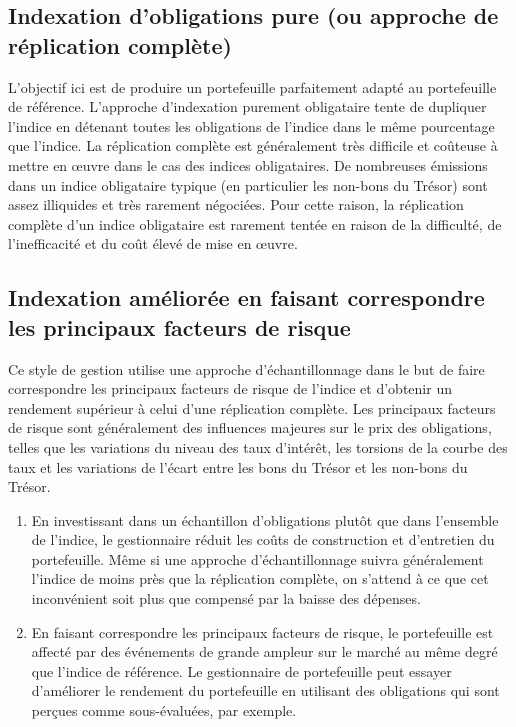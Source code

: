 \documentclass[12pt]{article}
\begin{document}
\subsection{Indexation d'obligations pure (ou approche de réplication complète)}
L'objectif ici est de produire un portefeuille parfaitement adapté au portefeuille de référence. L'approche d'indexation purement obligataire tente de dupliquer l'indice en détenant toutes les obligations de l'indice dans le même pourcentage que l'indice. La réplication complète est généralement très difficile et coûteuse à mettre en œuvre dans le cas des indices obligataires. De nombreuses émissions dans un indice obligataire typique (en particulier les non-bons du Trésor) sont assez illiquides et très rarement négociées. Pour cette raison, la réplication complète d'un indice obligataire est rarement tentée en raison de la difficulté, de l'inefficacité et du coût élevé de mise en œuvre.
\subsection{Indexation améliorée en faisant correspondre les principaux facteurs de risque}
Ce style de gestion utilise une approche d'échantillonnage dans le but de faire correspondre les principaux facteurs de risque de l'indice et d'obtenir un rendement supérieur à celui d'une réplication complète. Les principaux facteurs de risque sont généralement des influences majeures sur le prix des obligations, telles que les variations du niveau des taux d'intérêt, les torsions de la courbe des taux et les variations de l'écart entre les bons du Trésor et les non-bons du Trésor. 
\begin{enumerate}
\item En investissant dans un échantillon d'obligations plutôt que dans l'ensemble de l'indice, le gestionnaire réduit les coûts de construction et d'entretien du portefeuille. Même si une approche d'échantillonnage suivra généralement l'indice de moins près que la réplication complète, on s'attend à ce que cet inconvénient soit plus que compensé par la baisse des dépenses.
\item En faisant correspondre les principaux facteurs de risque, le portefeuille est affecté par des événements de grande ampleur sur le marché au même degré que l'indice de référence. Le gestionnaire de portefeuille peut essayer d’améliorer le rendement du portefeuille en utilisant des obligations qui sont perçues comme sous-évaluées, par exemple.
\end{enumerate}
\end{document}
